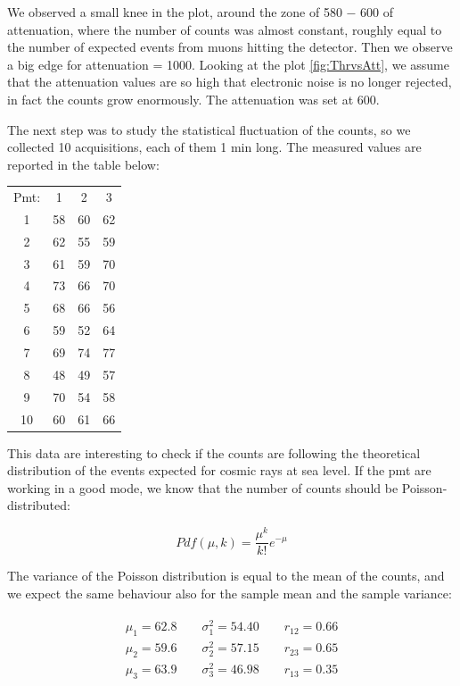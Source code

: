 We observed a small knee in the plot, around the zone of 580 − 600 of attenuation, where the number of counts was almost constant, roughly equal to the number of expected events from muons hitting the detector. Then we observe a big edge for attenuation = 1000. Looking at the plot \ref{fig:ThrvsAtt}, we assume that the attenuation values are so high that electronic noise is no longer rejected, in fact the counts grow enormously. The attenuation was set at 600.

The next step was to study the statistical fluctuation of the counts, so we collected 10 acquisitions, each of them 1 min long. The measured values are reported in the table below:

\begin{center}
\begin{tabular}{|c|c|c|c|}
\hline 
Pmt: & 1 & 2 & 3 \\ 
1 & 58 & 60 & 62 \\ 
\hline 
2 & 62 & 55 & 59 \\ 
\hline 
3 & 61 & 59 & 70 \\ 
\hline 
4 & 73 & 66 & 70 \\ 
\hline 
5 & 68 & 66 & 56 \\ 
\hline 
6 & 59 & 52 & 64 \\ 
\hline 
7 & 69 & 74 & 77 \\ 
\hline 
8 & 48 & 49 & 57  \\ 
\hline 
9 & 70 & 54 & 58 \\ 
\hline 
10 & 60 & 61 & 66\\
\hline
\end{tabular} 
\end{center}

This data are interesting to check if the counts are following the theoretical distribution of the events expected for cosmic rays at sea level. If the pmt are working in a good mode, we know that the number of counts should be Poisson-distributed:

\begin{equation}
Pdf(\mu,k) =  \frac{\mu^{k}}{k!} e^{-\mu}
\end{equation}

The variance of the Poisson distribution is equal to the mean of the counts, and we expect the same behaviour also for the sample mean and the sample variance:

\begin{align*}
\begin{split}
\mu_{1} = 62.8	\qquad \sigma^{2}_{1} = 54.40 \qquad r_{12} = 0.66\\
\mu_{2} = 59.6	\qquad \sigma^{2}_{2} = 57.15 \qquad r_{23} = 0.65\\
\mu_{3} = 63.9	\qquad \sigma^{2}_{3} = 46.98 \qquad r_{13} = 0.35 \\
\end{split}
\end{align*}

